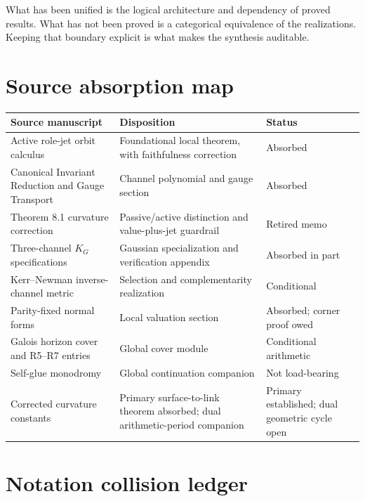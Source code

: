 \documentclass[11pt]{article}
\theoremstyle{remark}
\begin{document}
What has been unified is the logical architecture and dependency of proved
results. What has not been proved is a categorical equivalence of the
realizations. Keeping that boundary explicit is what makes the synthesis
auditable.

\appendix

\section{Source absorption map}

\begin{center}
\small
\begin{tabular}{>{\raggedright\arraybackslash}p{}
>{\raggedright\arraybackslash}p{}
>{\raggedright\arraybackslash}p{}}
\toprule
Source manuscript & Disposition & Status\\
\midrule
Active role-jet orbit calculus &
Foundational local theorem, with faithfulness correction & Absorbed\\
Canonical Invariant Reduction and Gauge Transport &
Channel polynomial and gauge section & Absorbed\\
Theorem 8.1 curvature correction &
Passive/active distinction and value-plus-jet guardrail & Retired memo\\
Three-channel $K_G$ specifications &
Gaussian specialization and verification appendix & Absorbed in part\\
Kerr--Newman inverse-channel metric &
Selection and complementarity realization & Conditional\\
Parity-fixed normal forms &
Local valuation section & Absorbed; corner proof owed\\
Galois horizon cover and R5--R7 entries &
Global cover module & Conditional arithmetic\\
Self-glue monodromy & Global continuation companion & Not load-bearing\\
Corrected curvature constants &
Primary surface-to-link theorem absorbed; dual arithmetic-period companion &
Primary established; dual geometric cycle open\\
\bottomrule
\end{tabular}
\end{center}

\section{Notation collision ledger}
\end{document}
